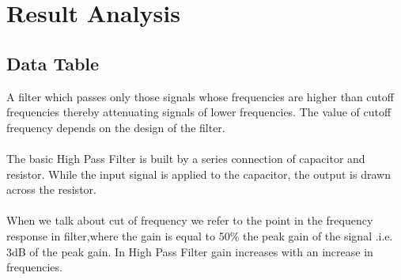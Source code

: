 \documentclass[12pt]{article}
\begin{document}
\section{Result Analysis}

\subsection{Data Table}
A filter which passes only those signals whose frequencies are higher than cutoff frequencies thereby attenuating signals of lower frequencies. The value of cutoff frequency depends on the design of the filter. \\~\\

The basic High Pass Filter is built by a series connection of capacitor and resistor. While the input signal is applied to the capacitor, the output is drawn across the resistor. \\~\\

When we talk about cut of frequency we refer to the point in the frequency response in filter,where the gain is equal to 50\% the peak gain of the signal .i.e. 3dB of the peak gain. In High Pass Filter gain increases with an increase in frequencies.
\end{document}
